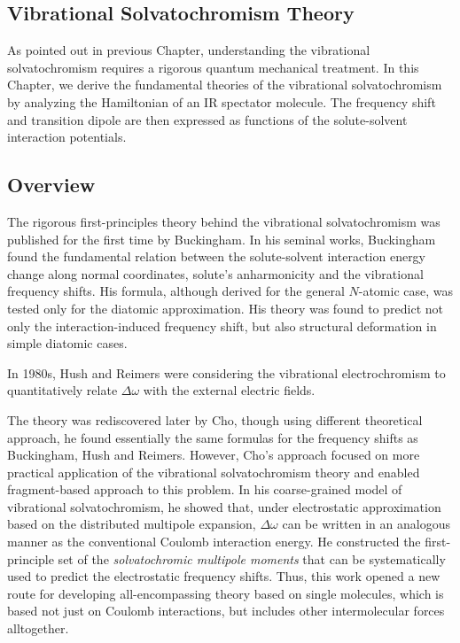 \documentclass[a4paper,titlepage,twoside,fleqn,12pt]{book}
\begin{document}

\begin{refsection}
\chapter{Vibrational Solvatochromism Theory\label{c:background}}

As pointed out in previous Chapter, understanding the vibrational
solvatochromism requires a rigorous quantum mechanical treatment.
In this Chapter, we derive the fundamental theories of the vibrational
solvatochromism by analyzing the Hamiltonian of an IR spectator molecule.
The frequency shift and transition dipole are then expressed as functions
of the solute-solvent interaction potentials.

\section{Overview\label{s:theory}}

The rigorous first\hyp{}principles theory behind the vibrational solvatochromism was published
for the first time by Buckingham.\citep{Buckingham.TransFaradaySoc.1960} 
In his seminal works, Buckingham found the fundamental 
relation between the solute\hyp{}solvent interaction energy change along normal 
coordinates, solute's anharmonicity and the vibrational frequency shifts.
His formula, although derived for the general $N$-atomic case, was tested
only for the diatomic approximation. His theory was found to predict not only
the interaction\hyp{}induced frequency shift, but also structural deformation in simple
diatomic cases.

In 1980s, Hush and Reimers were considering the vibrational electrochromism
to quantitatively relate $\Delta \omega$ with the external electric fields.

The theory was rediscovered later by Cho, though using different theoretical
approach, he found essentially the same formulas for the frequency shifts as Buckingham, Hush
and Reimers. However, Cho's 
approach focused on more practical application of the vibrational solvatochromism 
theory and enabled fragment\hyp{}based approach to this problem. In his coarse-grained
model of vibrational solvatochromism, he showed that,
under electrostatic approximation based on the distributed multipole expansion, 
$\Delta \omega$ can be written in an analogous manner as the conventional
Coulomb interaction energy. He constructed the first-principle set of 
the \emph{solvatochromic multipole moments} that can be systematically used
to predict the electrostatic frequency shifts. Thus, this work opened a new route for developing
all-encompassing theory based on single molecules, which is based not just on
Coulomb interactions, but includes other intermolecular forces alltogether.


\end{refsection}
\end{document}
